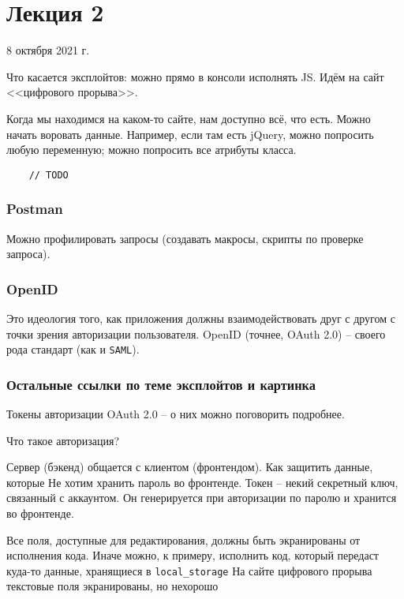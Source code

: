 \documentclass[main.tex]{subfiles}
\begin{document}
\section{Лекция 2}

8 октября 2021 г.

Что касается эксплойтов: можно прямо в консоли исполнять JS.
Идём на сайт <<цифрового прорыва>>.

Когда мы находимся на каком-то сайте, нам доступно всё, что есть.
Можно начать воровать данные.
Например, если там есть jQuery, можно попросить любую переменную; можно попросить все атрибуты класса.
\begin{verbatim}
	// TODO
\end{verbatim}

\subsubsection{Postman}

Можно профилировать запросы (создавать макросы, скрипты по проверке запроса).

\subsubsection{OpenID}

Это идеология того, как приложения должны взаимодействовать друг с другом с точки зрения авторизации пользователя.
OpenID (точнее, OAuth 2.0) -- своего рода стандарт  (как и \texttt{SAML}).

\subsubsection{Остальные ссылки по теме эксплойтов и картинка}



Токены авторизации OAuth 2.0 -- о них можно поговорить подробнее.

Что такое авторизация?

Сервер (бэкенд) общается с клиентом (фронтендом).
Как защитить данные, которые
Не хотим хранить пароль во фронтенде.
Токен -- некий секретный ключ, связанный с аккаунтом.
Он генерируется при авторизации по паролю и хранится во фронтенде.

Все поля, доступные для редактирования, должны быть экранированы от исполнения кода.
Иначе можно, к примеру, исполнить код, который передаст куда-то данные, хранящиеся в \texttt{local\_storage}
На сайте цифрового прорыва текстовые поля экранированы, но нехорошо
\end{document}
